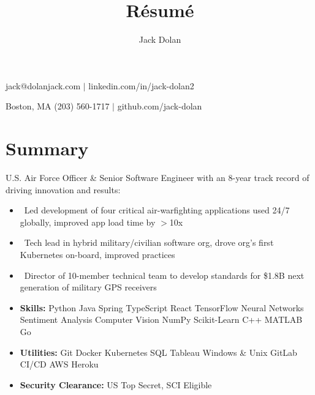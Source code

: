\documentclass{article}
\makeatletter
\renewcommand{\maketitle}{ 
{\huge\bfseries\theauthor}\hfill jack@dolanjack.com $|$ linkedin.com/in/jack-dolan2

\vspace{0.2em} 

Boston, MA \hfill (203) 560-1717 $|$ github.com/jack-dolan
}
\makeatother
\begin{document}
 
\title{R\'esum\'e} 
\author{Jack Dolan} 
\maketitle
{}


\section{Summary} 
U.S. Air Force Officer \& Senior Software Engineer with an 8-year track record of driving innovation and results:
    \begin{itemize}
    \itemsep0em
    \item \ Led development of four critical air-warfighting applications used 24/7 globally, improved app load time by $>$10x
    \item \ Tech lead in hybrid military/civilian software org, drove org’s first Kubernetes on-board, improved practices
    \item \ Director of 10-member technical team to develop standards for \$1.8B next generation of military GPS receivers
    \newline
    \item \textbf{Skills:} Python \text{\textbar} Java \text{\textbar} Spring \text{\textbar} TypeScript \text{\textbar} React \text{\textbar} TensorFlow \text{\textbar} Neural Networks \text{\textbar} Sentiment Analysis \text{\textbar} Computer Vision \text{\textbar} NumPy \text{\textbar} Scikit-Learn \text{\textbar} C++ \text{\textbar} MATLAB \text{\textbar} Go
    \item \textbf{Utilities:} Git \text{\textbar} Docker \text{\textbar} Kubernetes \text{\textbar} SQL \text{\textbar} Tableau \text{\textbar} Windows \& Unix \text{\textbar} GitLab CI/CD \text{\textbar} AWS \text{\textbar} Heroku
    \item \textbf{Security Clearance:} US Top Secret, SCI Eligible \end{itemize} 
\end{document}
